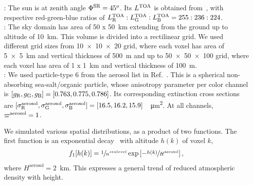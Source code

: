\documentclass[10pt,letterpaper]{article}
\begin{document}
: The sun is at zenith angle $\Phi^{\rm
  SR}=45^o$. Its $L^{\rm TOA}$ is obtained
from~\cite{BBradiance,sun_composition}, with respective red-green-blue
ratios of $L^{\rm TOA}_{\rm R}:L^{\rm TOA}_{\rm G}:L^{\rm TOA}_{\rm
  B}=255:236:224$.
\\

: The sky domain has area of \SI{50 x
  50}{\km} extending from the ground up to altitude of
\SI{10}{\km}. This volume is divided into a rectilinear grid. We used
different grid sizes from \num{10 x 10 x 20} grid, where each voxel
has area of \SI{5 x 5}{\km} and vertical thickness of \SI{500}{\metre}
and up to \num{50 x 50 x 100} grid, where each voxel has area of \SI{1
  x 1}{\km} and vertical thickness of \SI{100}{\metre}.
\\

: We used particle-type 6 from the aerosol list
in Ref.~\cite{Martonchik2009}. This is a spherical non-absorbing
sea-salt/organic particle, whose anisotropy parameter per color
channel is $[g_{\rm R},g_{\rm G},g_{\rm B}]=[0.763,0.775,0.786]$. Its
corresponding extinction cross sections are $[\sigma^{\rm
  aerosol}_{\rm R}, \sigma^{\rm aerosol}_{\rm G}, \sigma^{\rm
  aerosol}_{\rm
  B}]=[16.5,16.2,15.9]$~\si[sticky-per]{\per\micro\meter\squared}.  At
all channels, $\varpi^{\rm aerosol}=1$.

We simulated various spatial distributions, as a product of two
functions. The first function is an exponential decay~\cite{Levi1980}
with altitude $h(k)$ of voxel $k$,
\begin{align}
  f_1[h(k)] = \sfrac{1} {n^{sea level}}
  \exp\left[-\sfrac{h(k)}{H^\mathrm{aerosol}}\right],
\end{align}
where $H^\mathrm{aerosol}=2$~\si{\km}. This expresses a general trend
of reduced atmospheric density with height.
\end{document}
